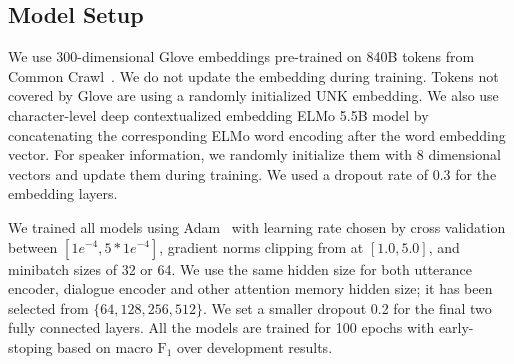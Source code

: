 \subsection{Model Setup}
\label{ssec:snt:exp-setup}

We use 300-dimensional Glove embeddings pre-trained on 840B tokens
from Common Crawl~\citep{pennington2014glove}. We do not update the
embedding during training. Tokens not covered by Glove are using a
randomly initialized UNK embedding. We also use character-level deep
contextualized embedding ELMo 5.5B model by concatenating the
corresponding ELMo word encoding after the word embedding
vector. For speaker information, we randomly initialize them with 8
dimensional vectors and update them during training. We used a
dropout rate of 0.3 for the embedding layers.

We trained all models using Adam~\citep{kingma2014adam} with learning
rate chosen by cross validation between $[1e^{-4}, 5*1e^{-4}]$,
gradient norms clipping from at $[1.0, 5.0]$, and minibatch sizes of
32 or 64. We use the same hidden size for both utterance encoder,
dialogue encoder and other attention memory hidden size; it has been
selected from $\{64, 128, 256, 512\}$. We set a smaller dropout 0.2
for the final two fully connected layers. All the models are trained
for 100 epochs with early-stoping based on macro $\text{F}_{1}$ over
development results.


